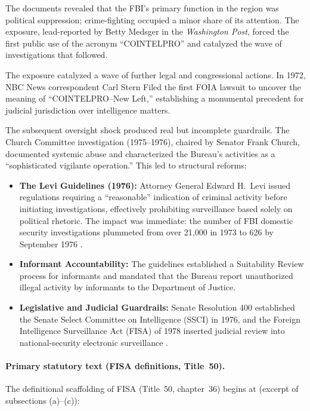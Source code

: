 The documents revealed that the FBI's primary function in the region was political suppression; crime-fighting occupied a minor share of its attention. The exposure, lead-reported by Betty Medsger in the \textit{Washington Post}, forced the first public use of the acronym ``COINTELPRO'' and catalyzed the wave of investigations that followed.

The exposure catalyzed a wave of further legal and congressional actions. In 1972, NBC News correspondent Carl Stern Filed the first FOIA lawsuit to uncover the meaning of ``COINTELPRO--New Left,'' establishing a monumental precedent for judicial jurisdiction over intelligence matters.

The subsequent oversight shock produced real but incomplete guardrails. The Church Committee investigation (1975--1976), chaired by Senator Frank Church, documented systemic abuse and characterized the Bureau's activities as a ``sophisticated vigilante operation.'' This led to structural reforms:
\begin{itemize}
    \item \textbf{The Levi Guidelines (1976):} Attorney General Edward H.\ Levi issued regulations requiring a ``reasonable'' indication of criminal activity before initiating investigations, effectively prohibiting surveillance based solely on political rhetoric. The impact was immediate: the number of FBI domestic security investigations plummeted from over 21,000 in 1973 to 626 by September 1976 \cite{doj_oig_levi_guidelines}.
    \item \textbf{Informant Accountability:} The guidelines established a Suitability Review process for informants and mandated that the Bureau report unauthorized illegal activity by informants to the Department of Justice.
    \item \textbf{Legislative and Judicial Guardrails:} Senate Resolution 400 established the Senate Select Committee on Intelligence (SSCI) in 1976, and the Foreign Intelligence Surveillance Act (FISA) of 1978 inserted judicial review into national-security electronic surveillance \cite{sres400_1976, fisa_1978}.
\end{itemize}

\paragraph{Primary statutory text (FISA definitions, Title~50).}
The definitional scaffolding of FISA (Title~50, chapter~36) begins at  (excerpt of subsections (a)--(c)):

